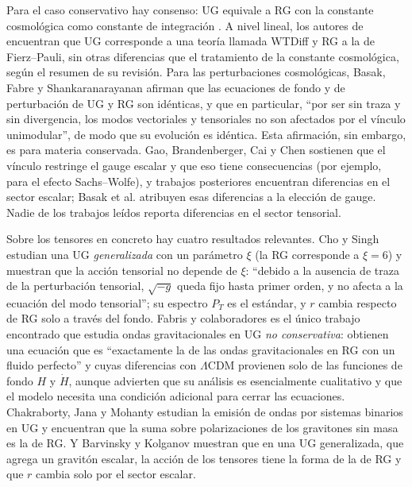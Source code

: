 Para el caso conservativo hay consenso: UG equivale a RG con la constante cosmológica como constante de integración \cite{padilla15,ellis11,bengochea23,carballo22}. A nivel lineal, los autores de \cite{carballo22} encuentran que UG corresponde a una teoría llamada WTDiff y RG a la de Fierz--Pauli, sin otras diferencias que el tratamiento de la constante cosmológica, según el resumen de su revisión. Para las perturbaciones cosmológicas, Basak, Fabre y Shankaranarayanan \cite{basak16} afirman que las ecuaciones de fondo y de perturbación de UG y RG son idénticas, y que en particular, ``por ser sin traza y sin divergencia, los modos vectoriales y tensoriales no son afectados por el vínculo unimodular'', de modo que su evolución es idéntica. Esta afirmación, sin embargo, es para materia conservada. Gao, Brandenberger, Cai y Chen \cite{gao14} sostienen que el vínculo restringe el gauge escalar y que eso tiene consecuencias (por ejemplo, para el efecto Sachs--Wolfe), y trabajos posteriores \cite{alvarenga23,linares23} encuentran diferencias en el sector escalar; Basak et al. atribuyen esas diferencias a la elección de gauge. Nadie de los trabajos leídos reporta diferencias en el sector tensorial.

Sobre los tensores en concreto hay cuatro resultados relevantes. Cho y Singh \cite{cho15} estudian una UG \emph{generalizada} con un parámetro $\xi$ (la RG corresponde a $\xi=6$) y muestran que la acción tensorial no depende de $\xi$: ``debido a la ausencia de traza de la perturbación tensorial, $\sqrt{-g}$ queda fijo hasta primer orden, y no afecta a la ecuación del modo tensorial''; su espectro $P_T$ es el estándar, y $r$ cambia respecto de RG solo a través del fondo. Fabris y colaboradores \cite{fabris22} es el único trabajo encontrado que estudia ondas gravitacionales en UG \emph{no conservativa}: obtienen una ecuación que es ``exactamente la de las ondas gravitacionales en RG con un fluido perfecto'' y cuyas diferencias con $\Lambda$CDM provienen solo de las funciones de fondo $H$ y $\dot H$, aunque advierten que su análisis es esencialmente cualitativo y que el modelo necesita una condición adicional para cerrar las ecuaciones. Chakraborty, Jana y Mohanty \cite{chakraborty25} estudian la emisión de ondas por sistemas binarios en UG y encuentran que la suma sobre polarizaciones de los gravitones sin masa es la de RG. Y Barvinsky y Kolganov \cite{barvinsky19} muestran que en una UG generalizada, que agrega un gravitón escalar, la acción de los tensores tiene la forma de la de RG y que $r$ cambia solo por el sector escalar.

